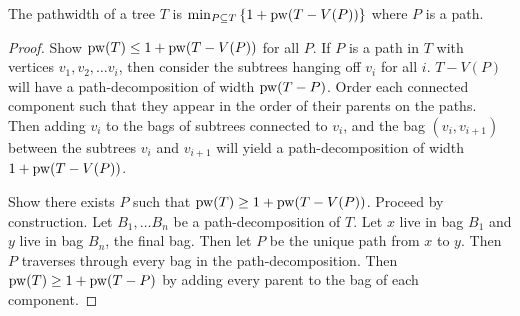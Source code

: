 \begin{proposition}
	The pathwidth of a tree \(T\) is \(\min_{P \subseteq T} \left\lbrace 1 + \operatorname{pw}(T - V(P))\right\rbrace \) where \(P\) is a path.
\end{proposition}

\begin{proof}[Proof]
	Show \(\operatorname{pw}(T) \leq 1 + \operatorname{pw}(T - V(P))\) for all $P$. If \(P\) is a path in \(T\) with vertices \(v_1, v_2, \ldots v_i\), then consider the subtrees hanging off \(v_i\) for all \(i\). \(T - V(P)\) will have a path-decomposition of width $\operatorname{pw}(T - P)$. Order each connected component such that they appear in the order of their parents on the paths. Then adding \(v_i\) to the bags of subtrees connected to \(v_i\), and the bag \((v_i, v_{i+1})\) between the subtrees \(v_i\) and \(v_{i + 1}\) will yield a path-decomposition of width \(1 + \operatorname{pw}(T - V(P))\).

	Show there exists $P$ such that \(\operatorname{pw}(T) \geq 1 + \operatorname{pw}(T - V(P))\). Proceed by construction. Let \(B_1, \ldots B_n\) be a path-decomposition of \(T\). Let \(x\) live in bag \(B_1\) and \(y\) live in bag \(B_n\), the final bag. Then let \(P\) be the unique path from \(x\) to \(y\). Then \(P\) traverses through every bag in the path-decomposition. Then \(\operatorname{pw}(T) \geq 1 + \operatorname{pw}(T - P)\) by adding every parent to the bag of each component. 
\end{proof}
